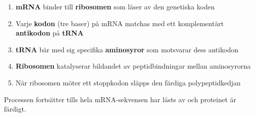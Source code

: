 \documentclass{exam}
\begin{document}
\begin{questions}
\begin{solution}
\begin{enumerate}
    \item \textbf{mRNA} binder till \textbf{ribosomen} som läser av den genetiska koden
    \item Varje \textbf{kodon} (tre baser) på mRNA matchas med ett komplementärt \textbf{antikodon} på \textbf{tRNA}
    \item \textbf{tRNA} bär med sig specifika \textbf{aminosyror} som motsvarar dess antikodon
    \item \textbf{Ribosomen} katalyserar bildandet av peptidbindningar mellan aminosyrorna
    \item När ribosomen möter ett stoppkodon släpps den färdiga polypeptidkedjan
\end{enumerate}

\vspace{2mm}
Processen fortsätter tills hela mRNA-sekvensen har lästs av och proteinet är färdigt.
\end{solution}

\end{questions}
\end{document}
